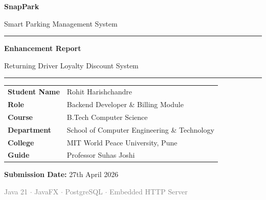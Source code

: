\documentclass[12pt,a4paper]{article}
\begin{document}
\begin{titlepage}
    \centering
    \vspace*{2cm}
    
    {\Huge\bfseries\textcolor{snapblue}{SnapPark}\par}
    \vspace{0.3cm}
    {\Large\textcolor{snapcyan}{Smart Parking Management System}\par}
    
    \vspace{1.5cm}
    \rule{\textwidth}{1.5pt}
    \vspace{0.5cm}
    
    {\LARGE\bfseries Enhancement Report\par}
    \vspace{0.3cm}
    {\Large\textcolor{snapblue}{Returning Driver Loyalty Discount System}\par}
    
    \vspace{0.5cm}
    \rule{\textwidth}{1.5pt}
    
    \vspace{2cm}
    
    \begin{tabular}{ll}
        \textbf{Student Name}    & Rohit Harishchandre \\
        \textbf{Role}            & Backend Developer \& Billing Module \\
        \textbf{Course}          & B.Tech Computer Science \\
        \textbf{Department}      & School of Computer Engineering \& Technology \\
        \textbf{College}         & MIT World Peace University, Pune \\
        \textbf{Guide}           & Professor Suhas Joshi \\
    \end{tabular}
    
    \vspace{2cm}
    
    {\large\textbf{Submission Date:} 27th April 2026\par}
    
    \vfill
    {\small\textcolor{gray}{Java 21 $\cdot$ JavaFX $\cdot$ PostgreSQL $\cdot$ Embedded HTTP Server}\par}
\end{titlepage}
\end{document}
